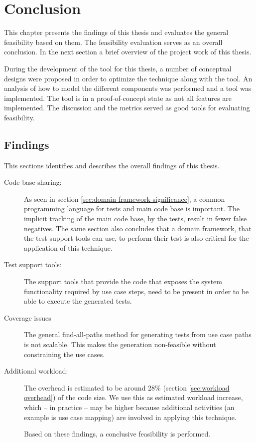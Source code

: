 \chapter{Conclusion}
This chapter presents the findings of this thesis and evaluates the general feasibility based on them. The feasibility evaluation serves as an overall conclusion. In the next section a brief overview of the project work of this thesis.\medskip

\noindent During the development of the tool for this thesis, a number of conceptual designs were proposed in order to optimize the technique along with the tool. An analysis of how to model the different components was performed and a tool was implemented. The tool is in a proof-of-concept state as not all features are implemented. The discussion and the metrics served as good tools for evaluating feasibility.

\section{Findings}
This sections identifies and describes the overall findings of this thesis.

\begin{description}

  \item[Code base sharing:] As seen in section \ref{sec:domain-framework-significance}, a common programming language for tests and main code base is important. The implicit tracking of the main code base, by the tests, result in fewer false negatives. The same section also concludes that a domain framework, that the test support tools can use, to perform their test is also critical for the application of this technique.

  \item[Test support tools:] The support tools that provide the code that exposes the system functionality required by use case steps, need to be present in order to be able to execute the generated tests.

  \item[Coverage issues] The general find-all-paths method for generating tests from use case paths is not scalable. This makes the generation non-feasible without constraining the use cases.

  \item[Additional workload:] The overhead is estimated to be around 28\% (section \ref{sec:workload overhead}) of the code size. We use this as estimated workload increase, which -- in practice -- may be higher because additional activities (an example is use case mapping) are involved in applying this technique.

Based on these findings, a conclusive feasibility is performed.
\end{description}

